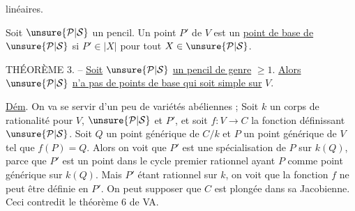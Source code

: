 linéaires.

Soit $\unsure{\mathcal P|\mathcal S}$ un pencil. Un point $P'$ de $V$ est un \uline{point de base de} $\unsure{\mathcal P|\mathcal S}$ si $P'\in|X|$ pour tout $X\in\unsure{\mathcal P|\mathcal S}$.

THÉORÈME 3. -- \uline{Soit} $\unsure{\mathcal P|\mathcal S}$ \uline{un pencil de genre} $\geq1$. \uline{Alors} $\unsure{\mathcal P|\mathcal S}$ \uline{n'a pas de points de base qui soit simple sur} $V$.

\uline{Dém}. On va se servir d'un peu de variétés abéliennes ; Soit $k$ un corps de rationalité pour $V$, $\unsure{\mathcal P|\mathcal S}$ et $P'$, et soit $f:V\longrightarrow C$ la fonction définissant $\unsure{\mathcal P|\mathcal S}$. Soit $Q$ un point générique de $C/k$ et $P$ un point générique de $V$ tel que $f(P)=Q$. Alors on voit que $P'$ est une spécialisation de $P$ sur $k(Q)$, parce que $P'$ est un point dans le cycle premier rationnel ayant $P$ comme point générique sur $k(Q)$. Mais $P'$ étant rationnel sur $k$, on voit que la fonction $f$ ne peut être définie en $P'$. On peut supposer que $C$ est plongée dans sa Jacobienne. Ceci contredit le théorème 6 de VA.

